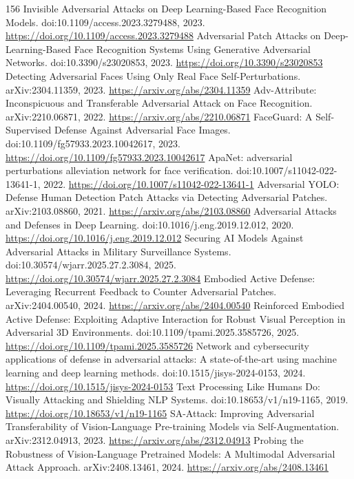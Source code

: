 \documentclass[11pt]{article}
\begin{document}
\begin{thebibliography}{156}
 Invisible Adversarial Attacks on Deep Learning-Based Face Recognition Models. doi:10.1109/access.2023.3279488, 2023. \url{https://doi.org/10.1109/access.2023.3279488}
 Adversarial Patch Attacks on Deep-Learning-Based Face Recognition Systems Using Generative Adversarial Networks. doi:10.3390/s23020853, 2023. \url{https://doi.org/10.3390/s23020853}
 Detecting Adversarial Faces Using Only Real Face Self-Perturbations. arXiv:2304.11359, 2023. \url{https://arxiv.org/abs/2304.11359}
 Adv-Attribute: Inconspicuous and Transferable Adversarial Attack on Face Recognition. arXiv:2210.06871, 2022. \url{https://arxiv.org/abs/2210.06871}
 FaceGuard: A Self-Supervised Defense Against Adversarial Face Images. doi:10.1109/fg57933.2023.10042617, 2023. \url{https://doi.org/10.1109/fg57933.2023.10042617}
 ApaNet: adversarial perturbations alleviation network for face verification. doi:10.1007/s11042-022-13641-1, 2022. \url{https://doi.org/10.1007/s11042-022-13641-1}
 Adversarial YOLO: Defense Human Detection Patch Attacks via Detecting Adversarial Patches. arXiv:2103.08860, 2021. \url{https://arxiv.org/abs/2103.08860}
 Adversarial Attacks and Defenses in Deep Learning. doi:10.1016/j.eng.2019.12.012, 2020. \url{https://doi.org/10.1016/j.eng.2019.12.012}
 Securing AI Models Against Adversarial Attacks in Military Surveillance Systems. doi:10.30574/wjarr.2025.27.2.3084, 2025. \url{https://doi.org/10.30574/wjarr.2025.27.2.3084}
 Embodied Active Defense: Leveraging Recurrent Feedback to Counter Adversarial Patches. arXiv:2404.00540, 2024. \url{https://arxiv.org/abs/2404.00540}
 Reinforced Embodied Active Defense: Exploiting Adaptive Interaction for Robust Visual Perception in Adversarial 3D Environments. doi:10.1109/tpami.2025.3585726, 2025. \url{https://doi.org/10.1109/tpami.2025.3585726}
 Network and cybersecurity applications of defense in adversarial attacks: A state-of-the-art using machine learning and deep learning methods. doi:10.1515/jisys-2024-0153, 2024. \url{https://doi.org/10.1515/jisys-2024-0153}
 Text Processing Like Humans Do: Visually Attacking and Shielding NLP Systems. doi:10.18653/v1/n19-1165, 2019. \url{https://doi.org/10.18653/v1/n19-1165}
 SA-Attack: Improving Adversarial Transferability of Vision-Language Pre-training Models via Self-Augmentation. arXiv:2312.04913, 2023. \url{https://arxiv.org/abs/2312.04913}
 Probing the Robustness of Vision-Language Pretrained Models: A Multimodal Adversarial Attack Approach. arXiv:2408.13461, 2024. \url{https://arxiv.org/abs/2408.13461}

\end{thebibliography}
\end{document}
